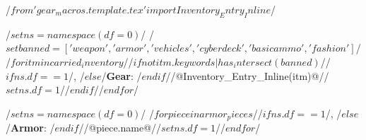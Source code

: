 /$from 'gear_macros.template.tex' import Inventory_Entry_Inline $/

/$set ns=namespace(df=0)$/
/$set banned=['weapon','armor','vehicles','cyberdeck' ,'basic ammo', 'fashion']$/
/$for itm in carried_inventory$//$if not itm.keywords|has_intersect(banned)$//$if ns.df==1$/, /$else$/\textbf{Gear}: /$endif$//@Inventory_Entry_Inline(itm)@//$set ns.df=1$//$endif$//$endfor$/

\par
/$set ns=namespace(df=0)$/
 /$ for piece in armor_pieces $//$if ns.df==1$/, /$else$/\textbf{Armor}: /$endif$//@piece.name@//$set ns.df=1$//$ endfor $/
